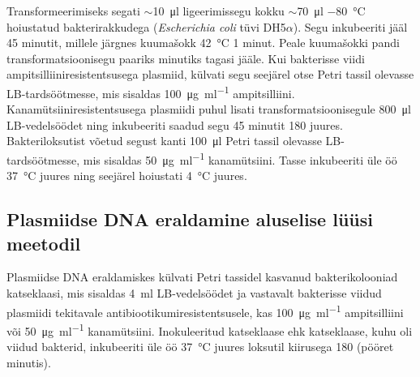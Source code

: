 \documentclass{trkut}%
\begin{document}
Transformeerimiseks segati $\sim$\SI{10}{\micro\litre} ligeerimissegu kokku $\sim$\SI{70}{\micro\litre} \SI{-80}{\celsius} hoiustatud bakterirakkudega (\textit{Escherichia coli} tüvi DH5$\alpha$). Segu inkubeeriti jääl 45 minutit, millele järgnes kuumašokk \SI{42}{\celsius} 1 minut. Peale kuumašokki pandi transformatsioonisegu paariks minutiks tagasi jääle. Kui bakterisse viidi ampitsilliiniresistentsusega plasmiid, külvati segu seejärel otse Petri tassil olevasse LB-tardsöötmesse, mis sisaldas \SI{100}{\micro\gram\per\milli\litre} ampitsilliini. Kanamütsiiniresistentsusega plasmiidi puhul lisati transformatsioonisegule \SI{800}{\micro\litre} LB-vedelsöödet ning inkubeeriti saadud segu 45 minutit \SI{180}{\rpm} juures. Bakteriloksutist võetud segust kanti \SI{100}{\micro\litre} Petri tassil olevasse LB-tardsöötmesse, mis sisaldas \SI{50}{\micro\gram\per\milli\litre} kanamütsiini. Tasse inkubeeriti üle öö \SI{37}{\celsius} juures ning seejärel hoiustati \SI{4}{\celsius} juures. 

\subsection{Plasmiidse DNA eraldamine aluselise lüüsi meetodil}

Plasmiidse DNA eraldamiskes külvati Petri tassidel kasvanud bakterikolooniad katseklaasi, mis sisaldas \SI{4}{\milli\litre} LB-vedelsöödet ja vastavalt bakterisse viidud plasmiidi tekitavale antibiootikumiresistentsusele, kas \SI{100}{\micro\gram\per\milli\litre} ampitsilliini või \SI{50}{\micro\gram\per\milli\litre} kanamütsiini. Inokuleeritud katseklaase ehk katseklaase, kuhu oli viidud bakterid, inkubeeriti üle öö \SI{37}{\celsius} juures loksutil kiirusega \SI{180}{\rpm} (pööret minutis). 
\end{document}
